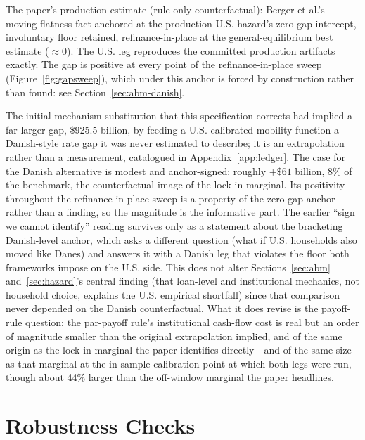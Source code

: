 \documentclass[12pt]{article}
\begin{document}
\begin{table}[H]
\begin{threeparttable}
\begin{tablenotes}[flushleft]
\item[d] The paper's production estimate (rule-only counterfactual): Berger et al.'s moving-flatness fact anchored at the production U.S. hazard's zero-gap intercept, involuntary floor retained, refinance-in-place at the general-equilibrium best estimate ($\approx$0). The U.S. leg reproduces the committed production artifacts exactly. The gap is positive at every point of the refinance-in-place sweep (Figure~\ref{fig:gapsweep}), which under this anchor is forced by construction rather than found: see Section~\ref{sec:abm-danish}.
\end{tablenotes}
\end{threeparttable}
\end{table}

The initial mechanism-substitution that this specification corrects had implied a far larger gap, \$925.5 billion, by feeding a U.S.-calibrated mobility function a Danish-style rate gap it was never estimated to describe; it is an extrapolation rather than a measurement, catalogued in Appendix~\ref{app:ledger}. The case for the Danish alternative is modest and anchor-signed: roughly $+\$61$ billion, 8\% of the benchmark, the counterfactual image of the lock-in marginal. Its positivity throughout the refinance-in-place sweep is a property of the zero-gap anchor rather than a finding, so the magnitude is the informative part. The earlier ``sign we cannot identify'' reading survives only as a statement about the bracketing Danish-level anchor, which asks a different question (what if U.S. households also moved like Danes) and answers it with a Danish leg that violates the floor both frameworks impose on the U.S. side. This does not alter Sections~\ref{sec:abm} and~\ref{sec:hazard}'s central finding (that loan-level and institutional mechanics, not household choice, explains the U.S. empirical shortfall) since that comparison never depended on the Danish counterfactual. What it does revise is the payoff-rule question: the par-payoff rule's institutional cash-flow cost is real but an order of magnitude smaller than the original extrapolation implied, and of the same origin as the lock-in marginal the paper identifies directly---and of the same size as that marginal at the in-sample calibration point at which both legs were run, though about 44\% larger than the off-window marginal the paper headlines.

\section{Robustness Checks}\label{sec:robustness}
\end{document}
